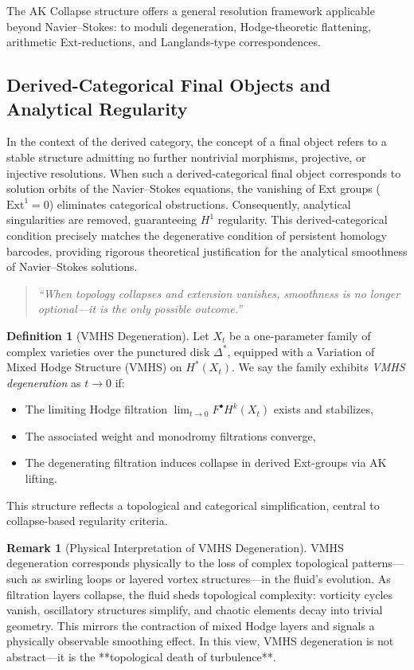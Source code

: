\documentclass[11pt]{article}
\theoremstyle{definition}
\newtheorem{definition}[theorem]{Definition}
\newtheorem{remark}[theorem]{Remark}
\begin{document}
The AK Collapse structure offers a general resolution framework applicable beyond Navier–Stokes:  
to moduli degeneration, Hodge-theoretic flattening, arithmetic Ext-reductions, and Langlands-type correspondences.

\subsection{Derived-Categorical Final Objects and Analytical Regularity}

In the context of the derived category, the concept of a final object refers to a stable structure admitting no further nontrivial morphisms, projective, or injective resolutions. When such a derived-categorical final object corresponds to solution orbits of the Navier–Stokes equations, the vanishing of Ext groups ($\mathrm{Ext}^1=0$) eliminates categorical obstructions. Consequently, analytical singularities are removed, guaranteeing $H^1$ regularity. This derived-categorical condition precisely matches the degenerative condition of persistent homology barcodes, providing rigorous theoretical justification for the analytical smoothness of Navier–Stokes solutions.

\begin{quote}
\textit{“When topology collapses and extension vanishes, smoothness is no longer optional—it is the only possible outcome.”}
\end{quote}

\begin{definition}[VMHS Degeneration] \label{def:vmhs-collapse}
Let $X_t$ be a one-parameter family of complex varieties over the punctured disk $\Delta^*$, equipped with a Variation of Mixed Hodge Structure (VMHS) on $H^*(X_t)$.  
We say the family exhibits \emph{VMHS degeneration} as $t \to 0$ if:
\begin{itemize}
  \item The limiting Hodge filtration $\lim_{t \to 0} F^\bullet H^k(X_t)$ exists and stabilizes,
  \item The associated weight and monodromy filtrations converge,
  \item The degenerating filtration induces collapse in derived Ext-groups via AK lifting.
\end{itemize}
This structure reflects a topological and categorical simplification, central to collapse-based regularity criteria.
\end{definition}

\begin{remark}[Physical Interpretation of VMHS Degeneration]
VMHS degeneration corresponds physically to the loss of complex topological patterns—such as swirling loops or layered vortex structures—in the fluid’s evolution.  
As filtration layers collapse, the fluid sheds topological complexity:  
vorticity cycles vanish, oscillatory structures simplify, and chaotic elements decay into trivial geometry.  
This mirrors the contraction of mixed Hodge layers and signals a physically observable smoothing effect.  
In this view, VMHS degeneration is not abstract—it is the **topological death of turbulence**.
\end{remark}
\end{document}
